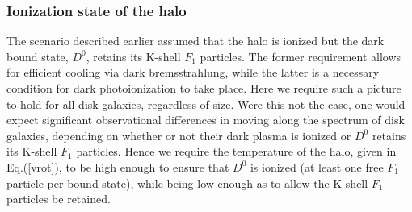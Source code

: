 \documentclass[12pt]{article}
\begin{document}
{{\subsubsection{Ionization state of the halo}

The scenario described earlier assumed that the halo is ionized but the
dark bound state, $D ^0$, retains its K-shell $F_1$ particles. The
former requirement allows for efficient cooling via dark bremsstrahlung,
while the latter is a necessary condition for dark photoionization to
take place. Here we require such a picture to hold for all disk
galaxies, regardless of size. Were this not the case, one would expect
significant observational differences in moving along the spectrum of
disk galaxies, depending on whether or not their dark plasma is ionized
or $D ^0$ retains its K-shell $F_1$ particles. Hence we require the
temperature of the halo, given in Eq.(\ref{vrot}), to be high enough to
ensure that $D ^0 $ is ionized (at least one free $F_1$ particle per
bound state), while being low enough as to allow the K-shell $F_1$
particles be retained. 

}}
\end{document}
